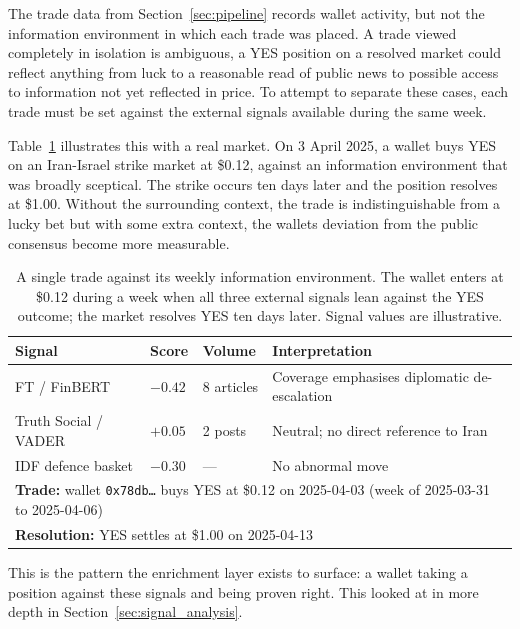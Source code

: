 \documentclass[11pt]{article}
\begin{document}
The trade data from Section~\ref{sec:pipeline} records wallet
activity, but not the information environment in which each trade
was placed. 
A trade viewed completely in isolation is ambiguous,  a YES position
on a resolved market could reflect anything from luck to a reasonable read of public
news to possible access to information not yet reflected in price. 
To attempt to separate these cases, each trade must be set against the external
signals available during the same week.

\hspace{1cm}Table~\ref{tab:signal_motivation} illustrates this with a real
market. On 3 April 2025, a wallet buys YES on an Iran-Israel strike
market at \$0.12, against an information environment that was
broadly sceptical. The strike occurs ten days later and the position
resolves at \$1.00. Without the surrounding context, the trade is
indistinguishable from a lucky  bet but  with some extra context, the wallets deviation from the
public consensus become more measurable.

\begin{table}[H]
\centering
\caption{A single trade against its weekly information environment.
         The wallet enters at \$0.12 during a week when all three
         external signals lean against the YES outcome; the market
         resolves YES ten days later. Signal values are illustrative.}
\label{tab:signal_motivation}
\small
\begin{tabularx}{\textwidth}{l l l X}
\toprule
\textbf{Signal} & \textbf{Score} & \textbf{Volume} & \textbf{Interpretation} \\
\midrule
FT / FinBERT            & $-0.42$ & 8 articles & Coverage emphasises diplomatic de-escalation \\
Truth Social / VADER    & $+0.05$ & 2 posts    & Neutral; no direct reference to Iran \\
IDF defence basket      & $-0.30$ & ---        & No abnormal move \\
\midrule
\multicolumn{4}{l}{\textbf{Trade:} wallet \texttt{0x78db\ldots} buys YES at \$0.12 on 2025-04-03 (week of 2025-03-31 to 2025-04-06)} \\
\multicolumn{4}{l}{\textbf{Resolution:} YES settles at \$1.00 on 2025-04-13} \\
\bottomrule
\end{tabularx}
\end{table}

\noindent This is the pattern the enrichment layer exists to surface:
a wallet taking a position against these signals and
being proven right. 
This looked at in more depth in Section~\ref{sec:signal_analysis}.
\end{document}
